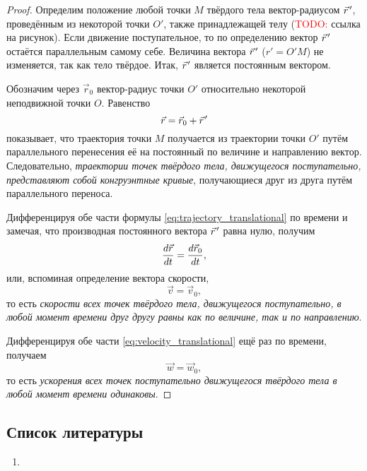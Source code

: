 \begin{proof}
  Определим положение любой точки $M$ твёрдого тела вектор-радиусом $\pvec{r}$,
  проведённым из некоторой точки $O'$, также принадлежащей телу
  (\textcolor{red}{TODO:} ссылка на рисунок). Если движение поступательное, то
  по определению вектор $\pvec{r}$ остаётся параллельным самому себе. Величина
  вектора $\pvec{r}$ ($r' = O'M$) не изменяется, так как тело твёрдое. Итак,
  $\pvec{r}$ является постоянным вектором.

  Обозначим через $\vec{r}_0$ вектор-радиус точки $O'$ относительно некоторой
  неподвижной точки $O$. Равенство
  \begin{equation}
    \label{eq:trajectory_translational}
    \vec{r} = \vec{r}_0 + \pvec{r}
  \end{equation}
  показывает, что траектория точки $M$ получается из траектории точки $O'$ путём
  параллельного перенесения её на постоянный по величине и направлению вектор.
  Следовательно, \textit{траектории точек твёрдого тела, движущегося
  поступательно, представляют собой конгруэнтные кривые}, получающиеся друг из
  друга путём параллельного переноса.

  Дифференцируя обе части формулы \ref{eq:trajectory_translational} по времени и
  замечая, что производная постоянного вектора $\pvec{r}$ равна нулю, получим
  \begin{equation*}
    \dt[\vec{r}] = \dt[\vec{r}_0],
  \end{equation*}
  или, вспоминая определение вектора скорости,
  \begin{equation}
    \label{eq:velocity_translational}
    \vec{v} = \vec{v}_0,
  \end{equation}
  то есть \textit{скорости всех точек твёрдого тела, движущегося поступательно,
  в любой момент времени друг другу равны как по величине, так и по
  направлению}.

  Дифференцируя обе части \ref{eq:velocity_translational} ещё раз по времени,
  получаем
  \begin{equation}
    \label{eq:acceleration_translational}
    \vec{w} = \vec{w}_0,
  \end{equation}
  то есть \textit{ускорения всех точек поступательно движущегося твёрдого тела в
  любой момент времени одинаковы}.
\end{proof}

\subsection{Список литературы}
\begin{enumerate}
  \item \cite{lourie}
\end{enumerate}

